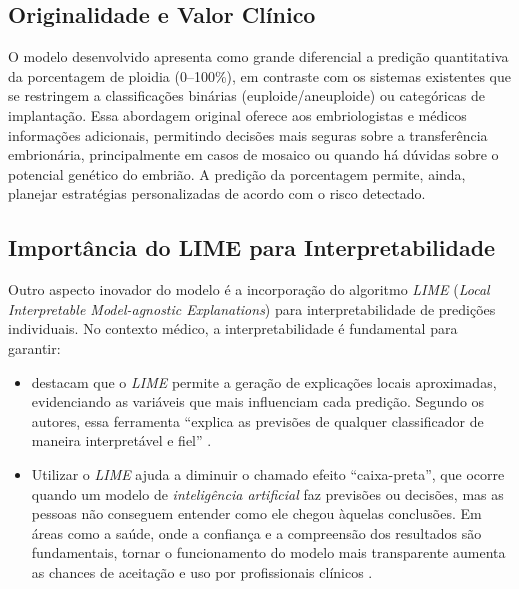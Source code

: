 \subsection{Originalidade e Valor Clínico}
O modelo desenvolvido apresenta como grande diferencial a predição quantitativa da porcentagem de ploidia (0--100\%), em contraste com os sistemas existentes que se restringem a classificações binárias (euploide/aneuploide) ou categóricas de implantação. Essa abordagem original oferece aos embriologistas e médicos informações adicionais, permitindo decisões mais seguras sobre a transferência embrionária, principalmente em casos de mosaico ou quando há dúvidas sobre o potencial genético do embrião. A predição da porcentagem permite, ainda, planejar estratégias personalizadas de acordo com o risco detectado.

\subsection{Importância do LIME para Interpretabilidade}
Outro aspecto inovador do modelo é a incorporação do algoritmo \textit{LIME} (\textit{Local Interpretable Model-agnostic Explanations}) para interpretabilidade de predições individuais. No contexto médico, a interpretabilidade é fundamental para garantir:

\begin{itemize}
    \item {} destacam que o \textit{LIME} permite a geração de explicações locais aproximadas, evidenciando as variáveis que mais influenciam cada predição. Segundo os autores, essa ferramenta ``explica as previsões de qualquer classificador de maneira interpretável e fiel'' \cite{ribeiro2016}.

    \item Utilizar o \textit{LIME} ajuda a diminuir o chamado efeito ``caixa-preta'', que ocorre quando um modelo de \textit{inteligência artificial} faz previsões ou decisões, mas as pessoas não conseguem entender como ele chegou àquelas conclusões. Em áreas como a saúde, onde a confiança e a compreensão dos resultados são fundamentais, tornar o funcionamento do modelo mais transparente aumenta as chances de aceitação e uso por profissionais clínicos \cite{samek2017explainable}.
\end{itemize}

